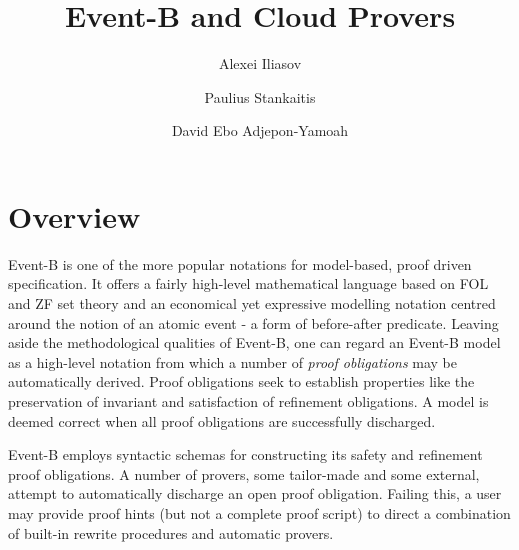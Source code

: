 \documentclass[twocolumn,a4paper,10pt]{article}
\begin{document}
\title{Event-B and Cloud Provers}


\author{
	Alexei Iliasov
 \and
 	Paulius Stankaitis
 \and 
 	David Ebo Adjepon-Yamoah
}

\maketitle

\section{Overview}

Event-B \cite{EventBBook} is one of the more popular notations for model-based, proof driven specification. It offers a fairly high-level mathematical language based on FOL and ZF set theory and an economical yet expressive modelling notation centred around the notion of an atomic event - a form of before-after predicate. Leaving aside the methodological qualities of Event-B, one can regard an Event-B model as a high-level notation from which a number of \emph{proof obligations} may be automatically derived. Proof obligations seek to establish properties like the preservation of invariant and satisfaction of refinement obligations. A model is deemed correct when all proof obligations are successfully discharged. 

Event-B employs syntactic schemas for constructing its safety and refinement proof obligations. A number of provers, some tailor-made and some external, attempt to automatically discharge an open proof obligation. Failing this, a user may provide proof hints (but not a complete proof script) to direct a combination of built-in rewrite procedures and automatic provers.
\end{document}

